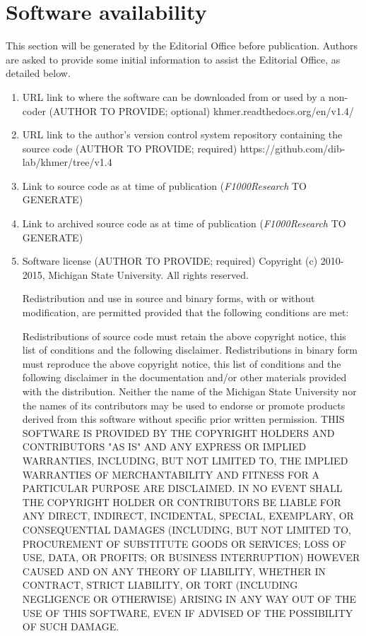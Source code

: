 \documentclass[10pt,a4paper,twocolumn]{article}
\begin{document}
\section*{Software availability}
This section will be generated by the Editorial Office before publication. Authors are asked to provide some initial information to assist the Editorial Office, as detailed below.
\begin{enumerate}
\item URL link to where the software can be downloaded from or used by a non-coder (AUTHOR TO PROVIDE; optional)
khmer.readthedocs.org/en/v1.4/
\item URL link to the author's version control system repository containing the source code
(AUTHOR TO PROVIDE; required)
https://github.com/dib-lab/khmer/tree/v1.4
\item Link to source code as at time of publication ({\textit{F1000Research}} TO GENERATE)
\item Link to archived source code as at time of publication ({\textit{F1000Research}} TO GENERATE)
\item Software license (AUTHOR TO PROVIDE; required)
Copyright (c) 2010-2015, Michigan State University. All rights reserved.

Redistribution and use in source and binary forms, with or without modification, are permitted provided that the following conditions are met:

Redistributions of source code must retain the above copyright notice, this list of conditions and the following disclaimer.
Redistributions in binary form must reproduce the above copyright notice, this list of conditions and the following disclaimer in the documentation and/or other materials provided with the distribution.
Neither the name of the Michigan State University nor the names of its contributors may be used to endorse or promote products derived from this software without specific prior written permission.
THIS SOFTWARE IS PROVIDED BY THE COPYRIGHT HOLDERS AND CONTRIBUTORS "AS IS" AND ANY EXPRESS OR IMPLIED WARRANTIES, INCLUDING, BUT NOT LIMITED TO, THE IMPLIED WARRANTIES OF MERCHANTABILITY AND FITNESS FOR A PARTICULAR PURPOSE ARE DISCLAIMED. IN NO EVENT SHALL THE COPYRIGHT HOLDER OR CONTRIBUTORS BE LIABLE FOR ANY DIRECT, INDIRECT, INCIDENTAL, SPECIAL, EXEMPLARY, OR CONSEQUENTIAL DAMAGES (INCLUDING, BUT NOT LIMITED TO, PROCUREMENT OF SUBSTITUTE GOODS OR SERVICES; LOSS OF USE, DATA, OR PROFITS; OR BUSINESS INTERRUPTION) HOWEVER CAUSED AND ON ANY THEORY OF LIABILITY, WHETHER IN CONTRACT, STRICT LIABILITY, OR TORT (INCLUDING NEGLIGENCE OR OTHERWISE) ARISING IN ANY WAY OUT OF THE USE OF THIS SOFTWARE, EVEN IF ADVISED OF THE POSSIBILITY OF SUCH DAMAGE.
\end{enumerate}
\end{document}
